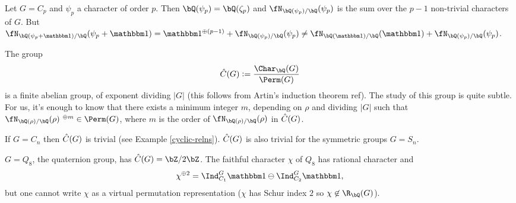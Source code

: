 \begin{example}
    Let $G = C_p$ and $\psi_p$ a character of order $p$. Then $\bQ(\psi_p) = \bQ(\zeta_p)$ and $\repnorm{\psi_p}$ is the sum over the $p - 1$ non-trivial characters of $G$. But $\repnorm{\psi_p + \trivial} = \trivial^{\oplus (p - 1)} + \repnorm{\psi_p} \not= \repnorm{\trivial} + \repnorm{\psi_p}$.
\end{example}



\begin{rem}\label{image-of-burnside}
The group $$\C(G) \defeq \frac{\Char_{\bQ}(G)}{\Perm(G)}$$ is a finite abelian group, of exponent dividing $|G|$ (this follows from Artin's induction theorem {\color{red} ref}). The study of this group is quite subtle. For us, it's enough to know that there exists a minimum integer $m$, depending on $\rho$ and dividing $|G|$ such that $\repnorm{\rho}^{\ \oplus m } \in \Perm(G)$, where $m$ is the order of $\repnorm{\rho}$ in $\hat{C}(G)$. 
\end{rem}
\begin{example}
If $G = C_n$ then $\hat{C}(G)$ is trivial (see Example \ref{cyclic-relns}). $\hat{C}(G)$ is also trivial for the symmetric groups $G = S_n$. 
\end{example}

 \begin{example}
    $G = Q_8$, the quaternion group, has $\C(G) = \bZ / 2 \bZ$. The faithful character $\chi$ of $Q_8$ has rational character and 
    \[ \chi^{\oplus 2} = \Ind_{C_1}^G \trivial \ominus \Ind_{C_2}^G \trivial, \]
    but one cannot write $\chi$ as a virtual permutation representation ($\chi$ has Schur index $2$ so $\chi \not\in \R_{\bQ}(G)$).  
 \end{example}



